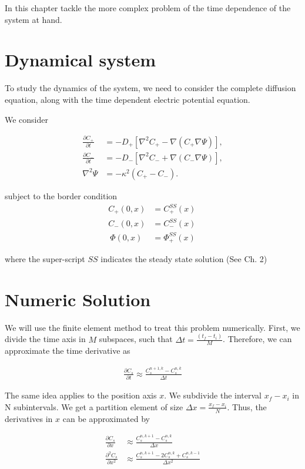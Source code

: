 In this chapter tackle  the more complex problem of the time dependence of the system at hand.

\section*{Dynamical system}

To study the dynamics of the system, we need to consider the complete diffusion equation, along with the time dependent electric potential equation.

We consider

\begin{align}
\frac{\partial C_+}{\partial t} &= - D_+ \left[\nabla^2 C_+ -  \nabla (C_+ \nabla \Psi) \right] , \\
\frac{\partial C_-}{\partial t} &= - D_- \left[\nabla^2 C_- + \nabla (C_- \nabla \Psi) \right], \\
\nabla^2 \Psi &= -\kappa^2 \left(C_+ - C_- \right).
\label{eq:dynamic-system}
\end{align}

subject to the border condition 
\begin{align}
C_+(0, x) & = C^{SS}_+(x)\\
C_-(0, x) & =  C^{SS}_-(x)\\\
\Phi(0, x) &= \Phi^{SS}_+(x)\
\end{align}

where the super-script $SS$ indicates the steady state solution (See Ch. 2)%

\section*{Numeric Solution}

We will use the finite element method to treat this problem numerically. First, we divide the time axis in $M$ subspaces, such that $\Delta t = \frac{(t_f- t_i)}{M}$. Therefore, we can approximate the time derivative as

\begin{align}
\frac{\partial C_s}{\partial t} \approx \frac{C^{n+1, k}_s - C^{n, k}_s}{\Delta t}
\end{align}

The same idea applies to the position axis $x$. We subdivide the interval $x_f - x_i$ in N subintervals. We get a partition element of size $\Delta x = \frac{x_f - x_i}{N}$. Thus, the derivatives in $x$ can be approximated by

\begin{align}
\frac{\partial C_s}{\partial x} &\approx \frac{C^{n, k+1}_s - C^{n, k}_s}{\Delta x}\\
\frac{\partial^2 C_s}{\partial x^2} &\approx \frac{C^{n, k + 1}_s - 2C^{n, k}_s + C^{n, k-1}_s}{\Delta x^2}
\end{align}

